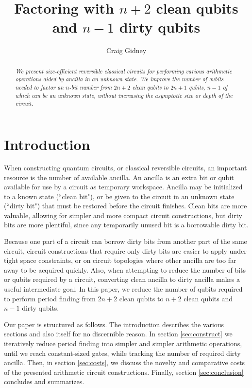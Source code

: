 \documentclass[twocolumn]{article}
\title{Factoring with $n+2$ clean qubits and $n-1$ dirty qubits}
\author{Craig Gidney}
\begin{document}
\maketitle

\begin{abstract}
\em
We present size-efficient reversible classical circuits for performing various arithmetic operations aided by ancilla in an unknown state.
We improve the number of qubits needed to factor an $n$-bit number from $2n+2$ clean qubits \cite{takahashi2006, haner2016} to $2n+1$ qubits, $n-1$ of which can be an unknown state, without increasing the asymptotic size or depth of the circuit.
\end{abstract}

\section{Introduction}

When constructing quantum circuits, or classical reversible circuits, an important resource is the number of available ancilla.
An ancilla is an extra bit or qubit available for use by a circuit as temporary workspace.
Ancilla may be initialized to a known state (``clean bit"), or be given to the circuit in an unknown state (``dirty bit") that must be restored before the circuit finishes.
Clean bits are more valuable, allowing for simpler and more compact circuit constructions, but dirty bits are more plentiful, since any temporarily unused bit is a borrowable dirty bit.

Because one part of a circuit can borrow dirty bits from another part of the same circuit, circuit constructions that require only dirty bits are easier to apply under tight space constraints, or on circuit topologies where other ancilla are too far away to be acquired quickly.
Also, when attempting to reduce the number of bits or qubits required by a circuit, converting clean ancilla to dirty ancilla makes a useful intermediate goal.
In this paper, we reduce the number of qubits required to perform period finding from $2n+2$ clean qubits \cite{takahashi2006, haner2016} to $n+2$ clean qubits and $n-1$ dirty qubits.

Our paper is structured as follows.
The introduction describes the various sections and also itself for no discernible reason.
In section \ref{sec:construct} we iteratively reduce period finding into simpler and simpler arithmetic operations, until we reach constant-sized gates, while tracking the number of required dirty ancilla.
Then, in section \ref{sec:costs}, we discuss the novelty and comparative costs of the presented arithmetic circuit constructions.
Finally, section \ref{sec:conclusion} concludes and summarizes.
\end{document}
